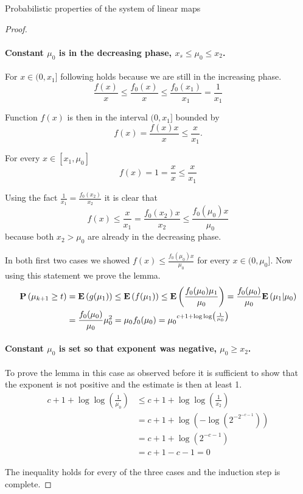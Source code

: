 \begin{section}{Probabilistic properties of the system of linear maps}
\begin{proof}
\paragraph{Constant $\mu_0$ is in the decreasing phase, $x_s \leq \mu_0 \leq x_2$.}
For $x \in (0, x_1]$ following holds because we are still in the increasing phase.
\[
\frac{f(x)}{x} \leq \frac{f_0(x)}{x} \leq \frac{f_0(x_1)}{x_1} = \frac{1}{x_1}
\]

Function $f(x)$ is then in the interval $(0, x_1]$ bounded by \[f(x) = \frac{f(x)x}{x} \leq \frac{x}{x_1} \text{.} \]

For every $x \in [x_1, \mu_0]$ 
\[ 
	f(x) = 1 = \frac{x}{x} \leq \frac{x}{x_1}
\]

Using the fact $\frac{1}{x_1} = \frac{f_0(x_2)}{x_2}$ it is clear that 
\[
	f(x) \leq \frac{x}{x_1} = \frac{f_0(x_2)x}{x_2} \leq \frac{f_0(\mu_0)x}{\mu_0}
\]
because both $x_2 > \mu_0$ are already in the decreasing phase.

In both first two cases we showed $f(x) \leq \frac{f_0(\mu_0)x}{\mu_0}$ for every $x \in (0, \mu_0]$. Now using this statement we prove the lemma.
\[
\begin{split}
\mathbf{P}\left(\mu_{k + 1} \geq t\right)
	& = \mathbf{E}\left(g(\mu_1)\right) \leq \mathbf{E}\left(f(\mu_1)\right) \leq \mathbf{E}\left(\frac{f_0(\mu_0)\mu_1}{\mu_0}\right) = \frac{f_0(\mu_0)}{\mu_0}\mathbf{E}\left(\mu_1|\mu_0\right) \\
	& = \frac{f_0(\mu_0)}{\mu_0}\mu_0 ^ 2 = \mu_0 f_0(\mu_0) = {\mu_0}^{c + 1 + \log \log \left(\frac{1}{\mu_0}\right)}
\end{split}
\]

\paragraph{Constant $\mu_0$ is set so that exponent was negative, $\mu_0 \geq x_2$.}
To prove the lemma in this case as observed before it is sufficient to show that the exponent is not positive and the estimate is then at least 1.
\[
\begin{split}
	c + 1 + \log \log \left( \frac{1}{\mu_0} \right) 
		& \leq c + 1 + \log \log \left( \frac{1}{x_2} \right) \\ 
		& = c + 1 + \log \left(- \log \left(2 ^ {-2 ^ {-c - 1}}\right)\right) \\ 
		& = c + 1 + \log \left(2 ^ {-c - 1}\right) \\ 
		& = c + 1 - c - 1 = 0
\end{split}
\]

The inequality holds for every of the three cases and the induction step is complete.
\end{proof}


\end{section}
